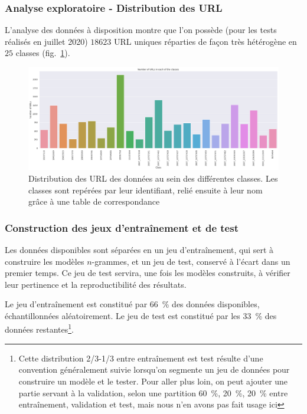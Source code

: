 \documentclass[11pt, a4paper]{article}
\begin{document}
\subsubsection{Analyse exploratoire - Distribution des URL}

L'analyse des données à disposition montre que l'on possède (pour les tests réalisés en juillet 2020) $18623$ URL uniques réparties de façon très hétérogène en $25$ classes (fig.~\ref{distribution}).

\begin{figure}[!h]
	\center
	\includegraphics[scale=0.29]{distribution}
	\caption{Distribution des URL des données au sein des différentes classes. Les classes sont repérées par leur identifiant, relié ensuite à leur nom grâce à une table de correspondance}
	\label{distribution}
\end{figure}

\subsubsection{Construction des jeux d'entraînement et de test}

Les données disponibles sont séparées en un jeu d'entraînement, qui sert à construire les modèles $n$-grammes, et un jeu de test, conservé à l'écart dans un premier temps. Ce jeu de test servira, une fois les modèles construits, à vérifier leur pertinence et la reproductibilité des résultats.

Le jeu d'entraînement est constitué par 66~\% des données disponibles, échantillonnées aléatoirement. Le jeu de test est constitué par les 33~\% des données restantes\footnote{Cette distribution 2/3-1/3 entre entraînement est test résulte d'une convention généralement suivie lorsqu'on segmente un jeu de données pour construire un modèle et le tester. Pour aller plus loin, on peut ajouter une partie servant à la validation, selon une partition 60~\%, 20~\%, 20~\% entre entraînement, validation et test, mais nous n'en avons pas fait usage ici}. 
\end{document}
